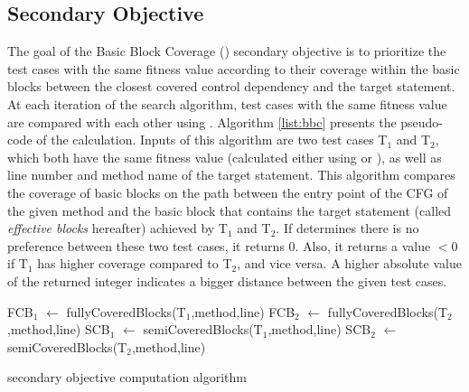 \subsection{Secondary Objective}

The goal of the Basic Block Coverage (\bbc) secondary objective is to prioritize the test cases with the same fitness value according to their coverage within the basic blocks between the closest covered control dependency and the target statement. At each iteration of the search algorithm, test cases with the same fitness value are compared with each other using \bbc. Algorithm \ref{list:bbc} presents the pseudo-code of the \bbc calculation. Inputs of this algorithm are two test cases T$_1$ and T$_2$, which both have the same fitness value (calculated either using \WS or \integ), as well as line number and method name of the target statement. This algorithm compares the coverage of basic blocks on the path between the entry point of the CFG of the given method and the basic block that contains the target statement (called \textit{effective blocks} hereafter) achieved by  T$_1$ and T$_2$. If \bbc determines there is no preference between these two test cases, it returns 0. Also, it returns a value $<0$ if T$_1$ has higher coverage compared to T$_2$, and vice versa. A higher absolute value of the returned integer indicates a bigger distance between the given test cases.
\begin{algorithm}[H]
    \label{list:bbc}
    \SetAlgoLined
    FCB$_1$ $\gets$  fullyCoveredBlocks(T$_1$,method,line)\;
    FCB$_2$ $\gets$  fullyCoveredBlocks(T$_2$,method,line)\;
    SCB$_1$ $\gets$  semiCoveredBlocks(T$_1$,method,line)\;
    SCB$_2$ $\gets$  semiCoveredBlocks(T$_2$,method,line)\;
    
        
     \caption{\bbc secondary objective computation algorithm}
\end{algorithm}



